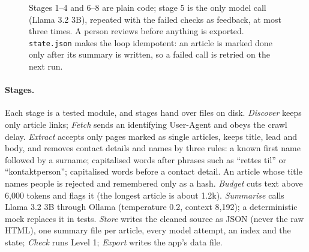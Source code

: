 \documentclass{article}
\begin{document}
\begin{figure}[h]
\centering
{}
\caption{Stages 1--4 and 6--8 are plain code; stage 5 is the only model call (Llama 3.2 3B), repeated
with the failed checks as feedback, at most three times. A person reviews before
anything is exported. \texttt{state.json} makes the loop idempotent: an article is marked done only
after its summary is written, so a failed call is retried on the next run.}
\label{fig:arch}
\end{figure}

\paragraph{Stages.} Each stage is a tested module, and stages hand over files on disk. \emph{Discover}
keeps only article links; \emph{Fetch} sends an identifying User-Agent and obeys the crawl delay. \emph{Extract} accepts only pages marked as single articles, keeps title, lead and
body, and removes contact details and names by three rules: a known first name followed by a surname;
capitalised words after phrases such as ``rettes til'' or ``kontaktperson''; capitalised words before a
contact detail. An article whose title names people is rejected and remembered only as a hash.
\emph{Budget} cuts text above 6,000 tokens and flags it (the longest article is about 1.2k).
\emph{Summarise} calls Llama 3.2 3B through Ollama (temperature 0.2, context 8,192); a deterministic
mock replaces it in tests. \emph{Store} writes the cleaned source as JSON (never the raw HTML), one summary file per
article, every model attempt, an index and the state; \emph{Check} runs Level 1; \emph{Export}
writes the app's data file.
\end{document}
